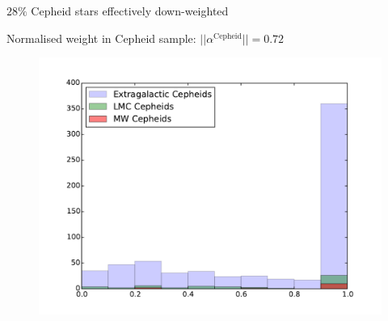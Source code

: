 \documentclass{beamer}
\newcommand{\Cepheid}{\mathrm{Cepheid}}
\newcommand{\Anchors}{\mathrm{Anchors}}
\newcommand{\SNe}{\mathrm{SNe\,Ia}}
\begin{document}
%
%
%
%
%
%

\begin{frame}{$28\%$ Cepheid stars effectively down-weighted}
\begin{center}
Normalised weight in Cepheid sample: $|| \alpha^{\Cepheid}|| = 0.72$
\end{center}
\begin{figure}
\includegraphics[scale=0.4]{../figures/chapter-h0/effective_HP_histogram.pdf} 
\end{figure}
\end{frame}
\end{document}
